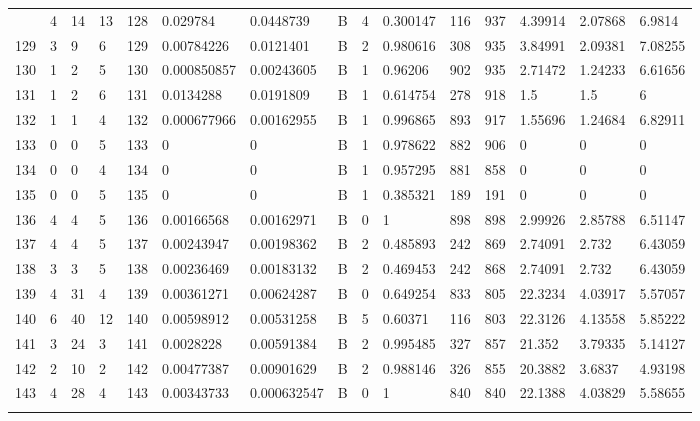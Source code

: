 \begin{latin}
\begin{longtable}{lllllllllllllll}
\begin{comment}
	128 & 4  & 14  & 13 & 128 & 0.029784       & 0.0448739      & B & 4  & 0.300147 & 116  & 937  & 4.39914 & 2.07868 & 6.9814  \\
	129 & 3  & 9   & 6  & 129 & 0.00784226     & 0.0121401      & B & 2  & 0.980616 & 308  & 935  & 3.84991 & 2.09381 & 7.08255 \\
	130 & 1  & 2   & 5  & 130 & 0.000850857    & 0.00243605     & B & 1  & 0.96206  & 902  & 935  & 2.71472 & 1.24233 & 6.61656 \\
	131 & 1  & 2   & 6  & 131 & 0.0134288      & 0.0191809      & B & 1  & 0.614754 & 278  & 918  & 1.5     & 1.5     & 6       \\
	132 & 1  & 1   & 4  & 132 & 0.000677966    & 0.00162955     & B & 1  & 0.996865 & 893  & 917  & 1.55696 & 1.24684 & 6.82911 \\
	133 & 0  & 0   & 5  & 133 & 0              & 0              & B & 1  & 0.978622 & 882  & 906  & 0       & 0       & 0       \\
	134 & 0  & 0   & 4  & 134 & 0              & 0              & B & 1  & 0.957295 & 881  & 858  & 0       & 0       & 0       \\
	135 & 0  & 0   & 5  & 135 & 0              & 0              & B & 1  & 0.385321 & 189  & 191  & 0       & 0       & 0       \\
	136 & 4  & 4   & 5  & 136 & 0.00166568     & 0.00162971     & B & 0  & 1        & 898  & 898  & 2.99926 & 2.85788 & 6.51147 \\
	137 & 4  & 4   & 5  & 137 & 0.00243947     & 0.00198362     & B & 2  & 0.485893 & 242  & 869  & 2.74091 & 2.732   & 6.43059 \\
	138 & 3  & 3   & 5  & 138 & 0.00236469     & 0.00183132     & B & 2  & 0.469453 & 242  & 868  & 2.74091 & 2.732   & 6.43059 \\
	139 & 4  & 31  & 4  & 139 & 0.00361271     & 0.00624287     & B & 0  & 0.649254 & 833  & 805  & 22.3234 & 4.03917 & 5.57057 \\
	140 & 6  & 40  & 12 & 140 & 0.00598912     & 0.00531258     & B & 5  & 0.60371  & 116  & 803  & 22.3126 & 4.13558 & 5.85222 \\
	141 & 3  & 24  & 3  & 141 & 0.0028228      & 0.00591384     & B & 2  & 0.995485 & 327  & 857  & 21.352  & 3.79335 & 5.14127 \\
	142 & 2  & 10  & 2  & 142 & 0.00477387     & 0.00901629     & B & 2  & 0.988146 & 326  & 855  & 20.3882 & 3.6837  & 4.93198 \\
	143 & 4  & 28  & 4  & 143 & 0.00343733     & 0.000632547    & B & 0  & 1        & 840  & 840  & 22.1388 & 4.03829 & 5.58655 \\

\end{comment}
\end{longtable}
\end{latin}
